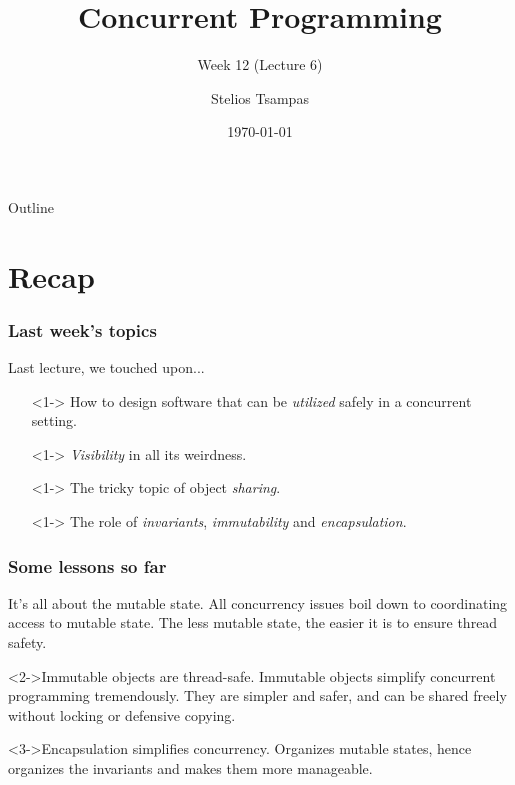 \documentclass[xcolor={dvipsnames,svgnames},aspectratio=169]{beamer}
\title{Concurrent Programming}
\subtitle{Week 12 (Lecture 6)}
\author{Stelios Tsampas}
\institute{
  \faEnvelope \; stelios@imada.sdu.dk
  \qquad
  \faGlobe \;
  \href{https://www.steliostsampas.com}{https://www.steliostsampas.com}
  \\\\\
  \faGithub \; stelios-tau/cp-2026
}
\date{\today}
\begin{document}
\frame{\titlepage}

\def\firstcircle{(0,0) circle (2cm)}
\def\secondcircle{(1.4,1.4) circle (2cm)}
\def\thirdcircle{(0:2.4) circle (2cm)}

\begin{frame}{Outline}
  \tableofcontents
\end{frame}

\section{Recap}

\begin{frame}[fragile]
  \frametitle{Last week's topics}

  Last lecture, we touched upon...

  \begin{itemize}
  \item[\faBook]<1-> How to design software that can be
    \emph{utilized} safely in a concurrent setting.
  \item[\faBook]<1-> \emph{Visibility} in all its weirdness.
  \item[\faBook]<1-> The tricky topic of object \emph{sharing}.
  \item[\faBook]<1-> The role of \emph{invariants}, \emph{immutability} and
    \emph{encapsulation}.
  \end{itemize}
\end{frame}

\begin{frame}[fragile]
  \frametitle{Some lessons so far}

  \begin{block}{\faBook\quad It's all about the mutable state.}
    All concurrency issues boil down to coordinating access to mutable
    state. The less mutable state, the easier it is to ensure thread safety.
  \end{block}

  \vspace{0.2cm}

  \begin{block}<2->{\faBook\quad Immutable objects are thread-safe.}
    Immutable objects simplify concurrent programming tremendously.
    They are simpler and safer, and can be shared freely without locking
    or defensive copying.
  \end{block}

  \vspace{0.2cm}

  \begin{block}<3->{\faBook\quad Encapsulation simplifies concurrency.}
    Organizes mutable states, hence organizes the invariants and makes them more
    manageable.
  \end{block}
\end{frame}
\end{document}
